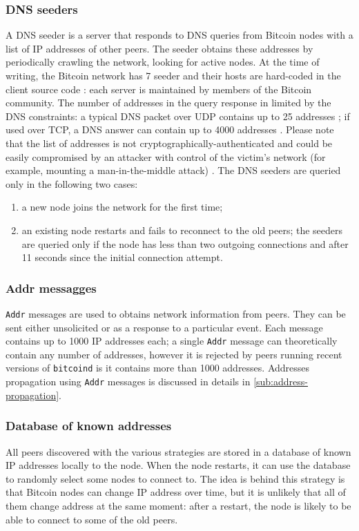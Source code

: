 \subsubsection{DNS seeders}
A DNS seeder is a server that responds to \ac{DNS} queries from Bitcoin nodes with a list of IP addresses of other peers.
The seeder obtains these addresses by periodically crawling the network, looking for active nodes.
At the time of writing, the Bitcoin network has \num{7} seeder and their hosts are hard-coded in the client source code \cite{bitcoin_dns}:
each server is maintained by members of the Bitcoin community.
The number of addresses in the query response in limited by the \ac{DNS} constraints:
a typical \ac{DNS} packet over UDP contains up to \num{25} addresses \cite{dns_stackoverflow};
if used over TCP, a \ac{DNS} answer can contain up to \num{4000} addresses \cite{dns_4000}.
Please note that the list of addresses is not cryptographically-authenticated and could be easily compromised by an attacker with control of the victim's network (for example, mounting a man-in-the-middle attack) \cite{bitcoin_guide}.
The DNS seeders are queried only in the following two cases:
\begin{enumerate}
	\item a new node joins the network for the first time;
	\item an existing node restarts and fails to reconnect to the old peers; the seeders are queried only if the node has less than two outgoing connections and after \num{11} seconds since the initial connection attempt.
\end{enumerate}

\subsubsection{Addr messagges}
\texttt{Addr} messages are used to obtains network information from peers.
They can be sent either unsolicited or as a response to a particular event.
Each message contains up to \num{1000} IP addresses each;
a single \texttt{Addr} message can theoretically contain any number of addresses, however it is rejected by peers running recent versions of \texttt{bitcoind} is it contains more than \num{1000} addresses.
Addresses propagation using \texttt{Addr} messages is discussed in details in \cref{sub:address-propagation}.

\subsubsection{Database of known addresses}
All peers discovered with the various strategies are stored in a database of known IP addresses locally to the node.
When the node restarts, it can use the database to randomly select some nodes to connect to.
The idea is behind this strategy is that Bitcoin nodes can change IP address over time, but it is unlikely that all of them change address at the same moment:
after a restart, the node is likely to be able to connect to some of the old peers.

